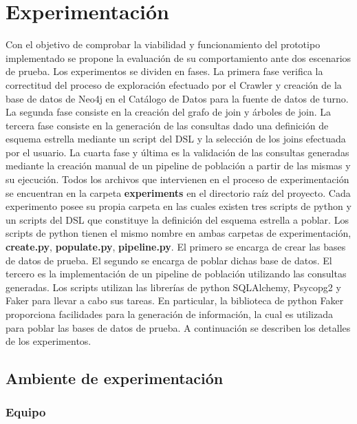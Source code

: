 \section{Experimentación} \label{section:Experimentation}

Con el objetivo de comprobar la viabilidad y funcionamiento del prototipo implementado se propone la evaluación 
de su comportamiento ante dos escenarios de prueba. Los experimentos se dividen en fases. La primera fase verifica 
la correctitud del proceso de exploración efectuado por el Crawler y creación de la base de datos de Neo4j en el  
Catálogo de Datos para la fuente de datos de turno. La segunda fase consiste en la creación 
del grafo de join y \'arboles de join. La tercera fase consiste en la generación de las consultas dado una 
definición de esquema 
estrella mediante un script del DSL y la selección de los joins efectuada por el usuario. La cuarta fase y \'ultima 
es la validación de las consultas generadas 
mediante la creación manual de un pipeline de población a partir de las mismas y su ejecución. Todos los archivos que intervienen 
en el proceso de experimentación se encuentran en la carpeta \textbf{experiments} en el directorio raíz del proyecto. 
Cada experimento posee su propia carpeta en las cuales existen tres scripts de python y un scripts del DSL que constituye 
la definición del esquema estrella a poblar. Los scripts de python tienen el mismo nombre en ambas carpetas de experimentación, 
\textbf{create.py}, \textbf{populate.py}, \textbf{pipeline.py}. El primero se encarga de 
crear las bases de datos de prueba. El segundo se 
encarga de poblar dichas base de datos. El tercero es la implementación de un pipeline de población utilizando 
las consultas generadas. Los scripts utilizan las librerías de python SQLAlchemy, Psycopg2 y Faker para llevar a 
cabo sus tareas. En particular, la biblioteca de python Faker proporciona facilidades para la generación de información, 
la cual es utilizada para poblar las bases de datos de prueba. A continuación se describen 
los detalles de los experimentos.

\subsection{Ambiente de experimentación}

\subsubsection{Equipo}


